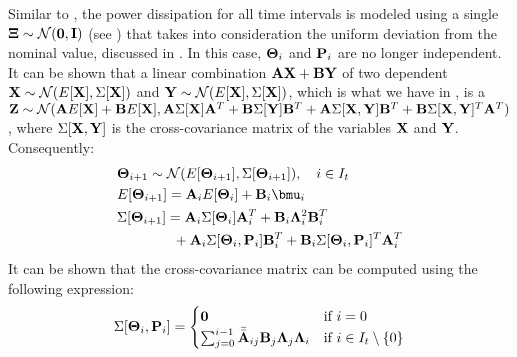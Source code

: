 Similar to , the power dissipation for all time intervals is modeled using a single \msnrv\ $\mathbf{\Xi} \sim \mathcal{N}(\mathbf{0}, \mathbf{I})$ (see ) that takes into consideration the uniform deviation from the nominal value, discussed in . In this case, $\mathbf{\Theta}_i$ and $\mathbf{P}_i$ are no longer independent. It can be shown that a linear combination $\mathbf{A} \mathbf{X} + \mathbf{B} \mathbf{Y}$ of two dependent \mnrvs\ $\mathbf{X} \sim \mathcal{N}(E[\mathbf{X}], \Sigma[\mathbf{X}])$ and $\mathbf{Y} \sim \mathcal{N}(E[\mathbf{X}], \Sigma[\mathbf{X}])$, which is what we have in , is a \mnrv\ $\mathbf{Z} \sim \mathcal{N}(\mathbf{A} E[\mathbf{X}] + \mathbf{B} E[\mathbf{X}], \mathbf{A} \Sigma[\mathbf{X}] \mathbf{A}^T + \mathbf{B} \Sigma[\mathbf{Y}] \mathbf{B}^T + \mathbf{A} \Sigma[\mathbf{X}, \mathbf{Y}] \mathbf{B}^T + \mathbf{B} \Sigma[\mathbf{X}, \mathbf{Y}]^T \mathbf{A}^T)$, where $\Sigma[\mathbf{X}, \mathbf{Y}]$ is the cross-covariance matrix of the variables $\mathbf{X}$ and $\mathbf{Y}$. Consequently:
\begin{align*}
  & \vtemperature_{i + 1} \sim \normal(\expectation{\vtemperature_{i + 1}}, \covariance{\vtemperature_{i + 1}}), \sep i \in \timeindex \\
  & \expectation{\vtemperature_{i + 1}} = \m{A}_i \expectation{\vtemperature_i} + \m{B}_i \vmean{i} \\
  & \covariance{\vtemperature_{i + 1}} = \m{A}_i \covariance{\vtemperature_i} \m{A}_i^T + \m{B}_i \ddeviation{i}^2 \m{B}_i^T \\
  & {} \qquad \qquad + \m{A}_i \covariance{\vtemperature_i, \vpower_i} \m{B}_i^T + \m{B}_i \covariance{\vtemperature_i, \vpower_i}^T \m{A}_i^T
\end{align*}
It can be shown that the cross-covariance matrix can be computed using the following expression:
\begin{equation} \equlabel{cross-covariance}
  \covariance{\vtemperature_i, \vpower_i} = \begin{cases}
    \mzero & \mbox{if } i = 0 \\
    \sum_{j = 0}^{i - 1} \atwo_{ij} \m{B}_j \ddeviation{j} \ddeviation{i} & \mbox{if } i \in \timeindex \setminus \{0\}
  \end{cases}
\end{equation}

